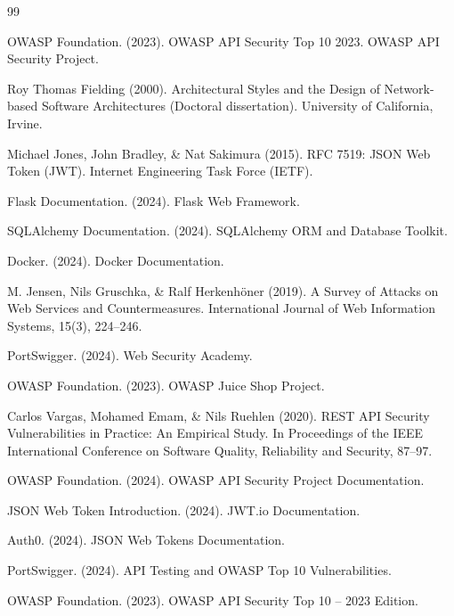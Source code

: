 \renewcommand\bibsection{\centering\section*{\large KAYNAKLAR}}
\begin{thebibliography}{99}
\makeatletter
\renewcommand*{\@biblabel}[1]{[#1]\hspace{1cm}}
\makeatother

OWASP Foundation. (2023). OWASP API Security Top 10 2023. OWASP API Security Project.

Roy Thomas Fielding (2000). Architectural Styles and the Design of Network-based Software Architectures (Doctoral dissertation). University of California, Irvine.

Michael Jones, John Bradley, \& Nat Sakimura (2015). RFC 7519: JSON Web Token (JWT). Internet Engineering Task Force (IETF).

Flask Documentation. (2024). Flask Web Framework.

SQLAlchemy Documentation. (2024). SQLAlchemy ORM and Database Toolkit.

Docker. (2024). Docker Documentation.

M. Jensen, Nils Gruschka, \& Ralf Herkenhöner (2019). A Survey of Attacks on Web Services and Countermeasures. International Journal of Web Information Systems, 15(3), 224--246.

PortSwigger. (2024). Web Security Academy.

OWASP Foundation. (2023). OWASP Juice Shop Project.

Carlos Vargas, Mohamed Emam, \& Nils Ruehlen (2020). REST API Security Vulnerabilities in Practice: An Empirical Study. In Proceedings of the IEEE International Conference on Software Quality, Reliability and Security, 87--97.

OWASP Foundation. (2024). OWASP API Security Project Documentation.

JSON Web Token Introduction. (2024). JWT.io Documentation.

Auth0. (2024). JSON Web Tokens Documentation.

PortSwigger. (2024). API Testing and OWASP Top 10 Vulnerabilities.

OWASP Foundation. (2023). OWASP API Security Top 10 -- 2023 Edition.

\end{thebibliography}
\clearpage
